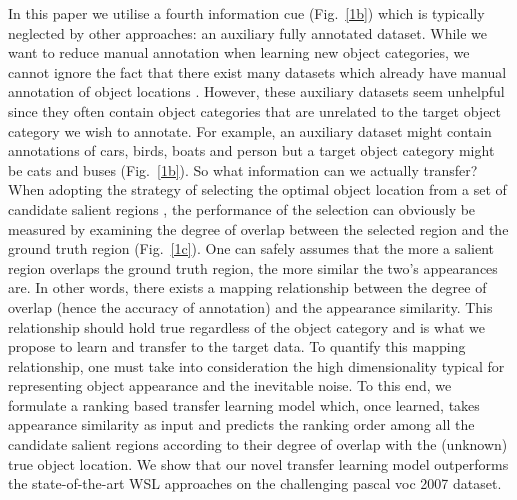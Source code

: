 \documentclass{bmvc2k}
\def\pascal07{{\sc pascal voc} 2007}
\begin{document}
In this paper we utilise a fourth information cue (Fig.~\ref{1b}) which is typically neglected by other approaches: an auxiliary fully annotated dataset. While we want to reduce manual annotation when learning new object categories, we cannot ignore the fact that there exist many datasets which already have manual annotation of object locations \cite{pascalvoc2007}. However, these auxiliary datasets seem unhelpful since they often contain object categories that are unrelated to the target object category we wish to annotate. For example, an auxiliary dataset might contain annotations of cars, birds, boats and person but a target object category might be cats and buses (Fig.~\ref{1b}). So what information can we actually transfer? When adopting the strategy of selecting the optimal object location from a set of candidate salient regions \cite{Deselaerslocalizing2010,Sivaiccv2011}, the performance of the selection can obviously be measured by examining the degree of overlap between the selected region and the ground truth region (Fig.~\ref{1c}). One can safely assumes that the more a salient region overlaps the ground truth region, the more similar the two's appearances are. In other words, there exists a mapping relationship between the degree of overlap (hence the accuracy of annotation) and the appearance similarity. This relationship should hold true regardless of the object category  and is what we propose to learn and transfer to the target data. To quantify this mapping relationship, one must take into consideration the high dimensionality typical for representing object appearance and the inevitable noise. To this end, we formulate a ranking based transfer learning model which, once learned,  takes appearance similarity as input and predicts the ranking order among all the candidate salient regions according to their degree of overlap with the (unknown) true object location.   We show that our novel transfer learning model outperforms the state-of-the-art WSL approaches on the challenging \pascal07 dataset. 
\end{document}
